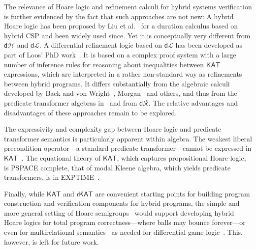 \documentclass[envcountsame]{llncs}
\newcommand{\KAT}{\mathsf{KAT}}
\newcommand{\rKAT}{\mathsf{rKAT}}
\newcommand{\dL}{\mathsf{d}\mathcal{L}}
\newcommand{\dH}{\mathsf{d}\mathcal{H}}
\newcommand{\dR}{\mathsf{d}\mathcal{R}}
\begin{document}
The relevance of Hoare logic and refinement calculi for hybrid systems
verification is further evidenced by the fact that such approaches are
not new: A hybrid Hoare logic has been proposed by Liu et
al.~\cite{LiuLQZZZZ10} for a duration calculus based on hybrid CSP and
been widely used since. Yet it is conceptually very different from
$\dH$ and $\dL$. A differential refinement logic based on $\dL$ has
been developed as part of Loos' PhD work~\cite{LoosP16}.  It is based
on a complex proof system with a large number of inference rules for
reasoning about inequalities between $\KAT$ expressions, which are
interpreted in a rather non-standard way as refinements between hybrid
programs. It differs substantially from the algebraic calculi
developed by Back and von Wright~\cite{BackW98},
Morgan~\cite{Morgan94} and others, and thus from the predicate
transformer algebras in~\cite{MuniveS19} and from $\dR$.  The relative
advantages and disadvantages of these approaches remain to be
explored.

The expressivity and complexity gap between Hoare logic and predicate
transformer semantics is particularly apparent within algebra. The
weakest liberal precondition operator---a standard predicate
transformer---cannot be expressed in $\KAT$~\cite{Struth18}.  The
equational theory of $\KAT$, which captures propositional Hoare logic,
is PSPACE complete, that of modal Kleene algebra, which yields
predicate transformers, is in EXPTIME~\cite{MollerS06}.  

Finally, while $\KAT$ and $\rKAT$ are convenient starting points for
building program construction and verification components for hybrid
programs, the simple and more general setting of Hoare
semigroups~\cite{Struth18} would support developing hybrid Hoare
logics for total program correctness---where balls may bounce
forever---or even for multirelational
semantics~\cite{FurusawaS16,FurusawaS15} as needed for differential
game logic~\cite{Platzer15}. This, however, is left for future work.










\end{document}
